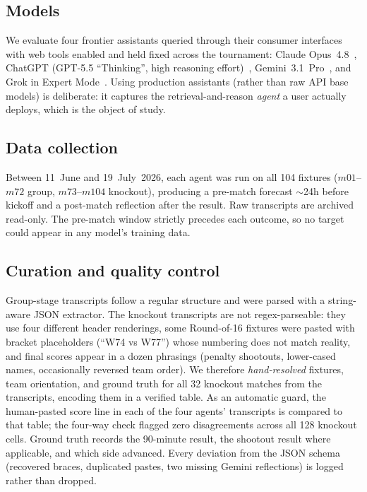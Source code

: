 \documentclass[sigconf,review]{acmart}
\begin{document}
\subsection{Models}
We evaluate four frontier assistants queried through their consumer interfaces
with web tools enabled and held fixed across the tournament: Claude
Opus~4.8~\cite{claude_opus48}, ChatGPT (GPT-5.5 ``Thinking'', high reasoning
effort)~\cite{gpt55}, Gemini~3.1~Pro~\cite{gemini31pro}, and Grok in Expert
Mode~\cite{grok_expert}. Using production assistants (rather than raw API base
models) is deliberate: it captures the retrieval-and-reason \emph{agent} a user
actually deploys, which is the object of study.

\subsection{Data collection}
Between 11~June and 19~July~2026, each agent was run on all 104 fixtures
($m01$--$m72$ group, $m73$--$m104$ knockout), producing a pre-match forecast
$\sim$24h before kickoff and a post-match reflection after the result. Raw
transcripts are archived read-only. The pre-match window strictly precedes each
outcome, so no target could appear in any model's training data.

\subsection{Curation and quality control}
\label{sec:curation}
Group-stage transcripts follow a regular structure and were parsed with a
string-aware JSON extractor. The knockout transcripts are not regex-parseable:
they use four different header renderings, some Round-of-16 fixtures were pasted
with bracket placeholders (``W74 vs W77'') whose numbering does not match
reality, and final scores appear in a dozen phrasings (penalty shootouts,
lower-cased names, occasionally reversed team order). We therefore
\emph{hand-resolved} fixtures, team orientation, and ground truth for all 32 knockout
matches from the transcripts, encoding them in a verified table. As an automatic
guard, the human-pasted score line in each of the four agents' transcripts is
compared to that table; the four-way check flagged zero disagreements across all
128 knockout cells. Ground truth records the 90-minute result, the shootout
result where applicable, and which side advanced. Every deviation from the JSON
schema (recovered braces, duplicated pastes, two missing Gemini reflections) is
logged rather than dropped.
\end{document}
